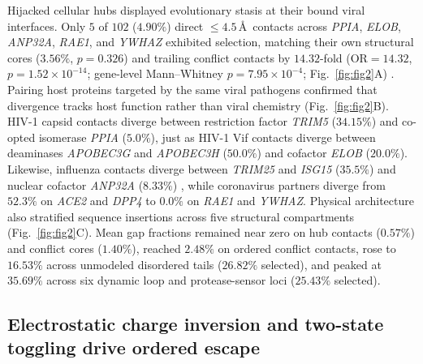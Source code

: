 \documentclass[12pt]{article}
\begin{document}
Hijacked cellular hubs displayed evolutionary stasis at their bound viral interfaces. Only $5$ of $102$ ($4.90\%$) direct $\le 4.5$\,\AA\ contacts across \textit{PPIA}, \textit{ELOB}, \textit{ANP32A}, \textit{RAE1}, and \textit{YWHAZ} exhibited selection, matching their own structural cores ($3.56\%$, $p = 0.326$) and trailing conflict contacts by $14.32$-fold ($\mathrm{OR} = 14.32$, $p = 1.52 \times 10^{-14}$; gene-level Mann--Whitney $p = 7.95 \times 10^{-4}$; Fig.~\ref{fig:fig2}A) \cite{gamble1996crystal,lu2013elob,arragain2024anp32a,li2021rae1,eisenreichova2022ywhaz}. Pairing host proteins targeted by the same viral pathogens confirmed that divergence tracks host function rather than viral chemistry (Fig.~\ref{fig:fig2}B). HIV-1 capsid contacts diverge between restriction factor \textit{TRIM5} ($34.15\%$) and co-opted isomerase \textit{PPIA} ($5.0\%$), just as HIV-1 Vif contacts diverge between deaminases \textit{APOBEC3G} and \textit{APOBEC3H} ($50.0\%$) and cofactor \textit{ELOB} ($20.0\%$). Likewise, influenza contacts diverge between \textit{TRIM25} and \textit{ISG15} ($35.5\%$) and nuclear cofactor \textit{ANP32A} ($8.33\%$) \cite{guan2011isg15,daczkowski2017isg15,koliopoulos2018trim25}, while coronavirus partners diverge from $52.3\%$ on \textit{ACE2} and \textit{DPP4} to $0.0\%$ on \textit{RAE1} and \textit{YWHAZ}. Physical architecture also stratified sequence insertions across five structural compartments (Fig.~\ref{fig:fig2}C). Mean gap fractions remained near zero on hub contacts ($0.57\%$) and conflict cores ($1.40\%$), reached $2.48\%$ on ordered conflict contacts, rose to $16.53\%$ across unmodeled disordered tails ($26.82\%$ selected), and peaked at $35.69\%$ across six dynamic loop and protease-sensor loci ($25.43\%$ selected).

\subsection*{Electrostatic charge inversion and two-state toggling drive ordered escape}
\end{document}
